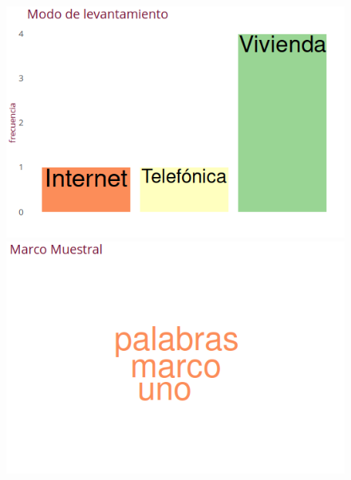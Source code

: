 \documentclass[10,a4paperpaper,]{article}
\begin{document}
\begin{figure}[!htb]
    \begin{minipage}{0.5\textwidth}
      \centering
      \includegraphics[width=1.1\linewidth]{figures/levantamiento.png}
    \end{minipage}\hfill
    \begin{minipage}{0.5\textwidth}
      \centering
      \includegraphics[width=1.1\linewidth]{figures/marco.png}
    \end{minipage}
\end{figure}
\end{document}
